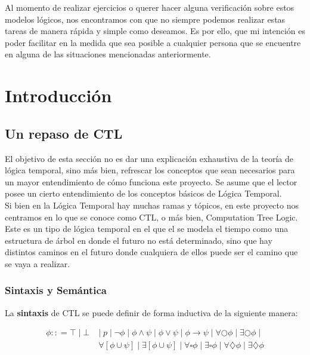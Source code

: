 \documentclass[11pt]{article}
\begin{document}
Al momento de realizar ejercicios o querer hacer alguna verificación sobre estos
modelos lógicos, nos encontramos con que no siempre podemos realizar estas tareas 
de manera rápida y simple como deseamos. Es por ello, que mi intención es poder 
facilitar en la medida que sea posible a cualquier persona que se encuentre en 
alguna de las situaciones mencionadas anteriormente.  

\section{Introducción}

\subsection{Un repaso de CTL}
El objetivo de esta sección no es dar una explicación exhaustiva de la teoría de 
lógica temporal, sino más bien, refrescar los conceptos que sean necesarios 
para un mayor entendimiento de cómo funciona este proyecto. Se asume que el lector
posee un cierto entendimiento de los conceptos básicos de Lógica Temporal. \\

Si bien en la Lógica Temporal hay muchas ramas y tópicos, en este proyecto nos 
centramos en lo que se conoce como CTL, o más bien, Computation Tree Logic. Este
es un tipo de lógica temporal en el que el se modela el tiempo como una estructura
de árbol en donde el futuro no está determinado, sino que hay distintos caminos 
en el futuro donde cualquiera de ellos puede ser el camino que se vaya a realizar.

\subsubsection{Sintaxis y Semántica}

La \textbf{sintaxis} de CTL se puede definir de forma inductiva de la siguiente manera:

\begin{align*}
  \phi :: = \top                       \; | \;  
            \bot                       \; & | \; 
            p                          \; | \; 
            \neg \phi                  \; | \;
            \phi \land \psi            \; | \;
            \phi \lor \psi             \; | \;
            \phi \rightarrow \psi      \; | \;
            \forall \bigcirc \phi      \; | \;
            \exists \bigcirc \phi      \; | \; \\
            & \forall [\phi \cup \psi] \; | \;
            \exists [\phi \cup \psi]   \; | \;
            \forall \square \phi       \; | \;
            \exists \square \phi       \; | \;
            \forall \diamondsuit \phi  \; | \;
            \exists \diamondsuit \phi 
\end{align*}
\end{document}
